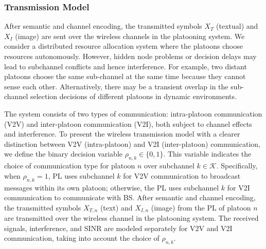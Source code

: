 \documentclass[10pt, lettersize,journal]{IEEEtran}
\begin{document}
	\subsubsection{Transmission Model}
	After semantic and channel encoding, the transmitted symbols ${X_{T}}$ (textual) and ${X_{I}}$ (image) are sent over the wireless channels in the platooning system. We consider a distributed resource allocation system where the platoons choose resources autonomously. However, hidden node problems or decision delays may lead to subchannel conflicts and hence interference. For example, two distant platoons choose the same sub-channel at the same time because they cannot sense each other. Alternatively, there may be a transient overlap in the sub-channel selection decisions of different platoons in dynamic environments. 
	
	The system consists of two types of communication: intra-platoon communication (V2V) and inter-platoon communication (V2I), both subject to channel effects and interference. To present the wireless transmission model with a clearer distinction between V2V (intra-platoon) and V2I (inter-platoon) communication, we define the binary decision variable ${\rho _{n,k}} \in \{ 0,1\}$. This variable indicates the choice of communication type for platoon $n$ over subchannel $k \in \mathcal{K}$. Specifically, when ${\rho _{n,k}} = 1$, PL uses subchannel $k$ for V2V communication to broadcast messages within its own platoon; otherwise, the PL uses subchannel $k$ for V2I communication to communicate with BS.
	After semantic and channel encoding, the transmitted symbols ${X_{T,n}}$ (text) and ${X_{I,n}}$ (image) from the PL of platoon $n$ are transmitted over the wireless channel in the platooning system. The received signals, interference, and SINR are modeled separately for V2V and V2I communication, taking into account the choice of ${\rho _{n,k}}$.
	
\end{document}
